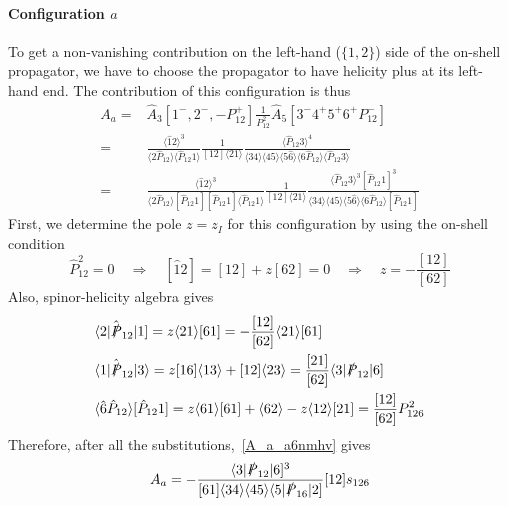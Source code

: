 \paragraph{Configuration $a$}
To get a non-vanishing contribution on the left-hand ($\{1,2\}$) side of the on-shell propagator, we have to choose the propagator to have helicity plus at its left-hand end.
The contribution of this configuration is thus  
\begin{equation}\label{A_a_a6nmhv}
\begin{split}
A_a = & \hat{A}_3[1^-,2^-, -P_{12}^+]\frac{1}{P_{12}^2}\hat{A}_5[3^-4^+5^+6^+ P_{12}^-]
\\
= &\frac{\langle \hat{1}2\rangle^3}{\langle 2\hat{P}_{12}\rangle\langle \hat{P}_{12} 1\rangle}
\frac{1}{[12]\langle 21\rangle}
\frac{\langle \hat{P}_{12} 3\rangle^4}{\langle 34\rangle\langle 45\rangle\langle 5\hat{6}\rangle\langle 6\hat{P}_{12}\rangle\langle \hat{P}_{12} 3\rangle}
\\
=&
\frac{\langle \hat{1}2\rangle^3}{\langle 2\hat{P}_{12}\rangle[\hat{P}_{12} 1][\hat{P}_{12} 1]\langle \hat{P}_{12} 1\rangle}
\frac{1}{[12]\langle 21\rangle}
\frac{\langle \hat{P}_{12} 3\rangle^3[\hat{P}_{12} 1]^3}{\langle 34\rangle\langle 45\rangle\langle 5\hat{6}\rangle\langle 6\hat{P}_{12}\rangle[\hat{P}_{12} 1]}
\end{split}
\end{equation}
First, we determine the pole $z=z_I$ for this configuration by using the on-shell condition 
\begin{equation}
\hat{P}_{12}^2 = 0
\quad\Rightarrow\quad
[\hat{1}2] =  [12] + z[62] = 0
\quad\Rightarrow\quad
z= -\frac{[12]}{[62]}
\end{equation}
Also, spinor-helicity algebra gives
\begin{equation}
\begin{split}
& \langle 2 |\hat{\slashed{P}}_{12}|1] = z\langle 21\rangle[61] = -\frac{[12]}{[62]}\langle 21 \rangle[61]
\\
&
\langle 1 |\hat{\slashed{P}}_{12}|3\rangle = 
z[16]\langle 13 \rangle + [12]\langle 23 \rangle
=\frac{[21]}{[62]}\langle 3 |\slashed{P}_{12}|6]
\\
&
\langle \hat{6}\hat{P}_{12}\rangle[\hat{P}_{12}1] = z\langle 61 \rangle[61] + \langle 62\rangle - z\langle 12\rangle[21]
=
\frac{[12]}{[62]}P_{126}^2
\end{split}
\end{equation}
Therefore, after all the substitutions,~\cref{A_a_a6nmhv} gives
\begin{equation}\label{a6a}
A_a = -\frac{\langle 3 |\slashed{P}_{12}|6]^3}{[61]\langle 34\rangle \langle 45\rangle\langle 5|\slashed{P}_{16}|2]}[12]s_{126}
\end{equation}
%
%
